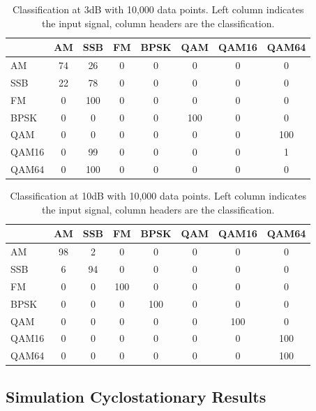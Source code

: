 \begin{table}
\centering
\caption{Classification at 3dB with 10,000 data points.  Left column indicates
the input signal, column headers are the classification.}
\begin{tabular}{ l | c | c | c | c | c | c | c } \hline
      &  AM  &  SSB & FM & BPSK & QAM & QAM16 & QAM64 \\ \hline \hline 
AM    &	 74 &	 26 &	 0 &	 0 &	 0 &	 0 &	 0 \\ \hline  
SSB   &	 22 &	 78 &	 0 &	 0 &	 0 &	 0 &	 0 \\ \hline  
FM    &	 0 &	 100 &	 0 &	 0 &	 0 &	 0 &	 0 \\ \hline  
BPSK  &	 0 &	 0 &	 0 &	 0 &	 100 &	 0 &	 0 \\ \hline  
QAM   &	 0 &	 0 &	 0 &	 0 &	 0 &	 0 &	 100 \\ \hline 
QAM16 &	 0 &	 99 &	 0 &	 0 &	 0 &	 0 &	 1 \\ \hline  
QAM64 &	 0 &	 100 &	 0 &	 0 &	 0 &	 0 &	 0 \\ \hline 
\end{tabular}
\label{tab:cumFalsePosTable3dB}
\end{table}

\begin{table}
\centering
\caption{Classification at 10dB with 10,000 data points.  Left column indicates
the input signal, column headers are the classification.}
\begin{tabular}{ l | c | c | c | c | c | c | c } \hline
      &  AM  &  SSB & FM & BPSK & QAM & QAM16 & QAM64 \\ \hline \hline 
AM    &	 98 &	 2 &	 0 &	 0 &	 0 &	 0 &	 0 \\ \hline \hline 
SSB   &	 6 &	 94 &	 0 &	 0 &	 0 &	 0 &	 0 \\ \hline 
FM    &	 0 &	 0 &	 100 &	 0 &	 0 &	 0 &	 0 \\ \hline  
BPSK  &	 0 &	 0 &	 0 &	 100 &	 0 &	 0 &	 0 \\ \hline  
QAM   &	 0 &	 0 &	 0 &	 0 &	 0 &	 100 &	 0 \\ \hline  
QAM16 &	 0 &	 0 &	 0 &	 0 &	 0 &	 0 &	 100 \\ \hline 
QAM64 &	 0 &	 0 &	 0 &	 0 &	 0 &	 0 &	 100 \\ \hline 
\end{tabular}
\label{tab:cumFalsePosTable10dB}
\end{table}

\newpage
\subsection*{Simulation Cyclostationary Results}

